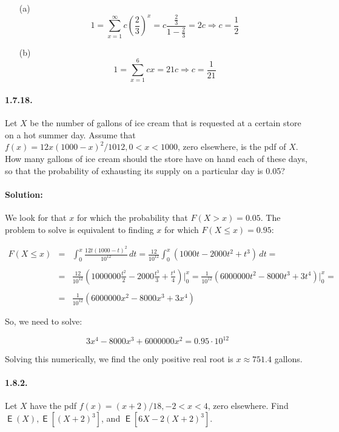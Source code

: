 \documentclass[12pt,a4paper]{article}
\DeclareMathOperator{\E}{\mathsf{E}}
\begin{document}
\begin{itemize}
	\item[(a)]
	\[
		1 = \sum_{x=1}^{\infty} c \left(\frac{2}{3}\right)^{x} = c\frac{\frac{2}{3}}{1 - \frac{2}{3}} = 2c \Rightarrow c = \frac{1}{2}
	\]
	
	\item[(b)]
	\[
		1 = \sum_{x=1}^{6}cx = 21c \Rightarrow c = \frac{1}{21}
	\]
\end{itemize} 

\paragraph{1.7.18.} Let $X$ be the number of gallons of ice cream that is requested at a certain store on a hot summer day. Assume that $f(x) = 12x(1000-x)^{2}/1012, 0 < x < 1000$, zero elsewhere, is the pdf of $X$. How many gallons of ice cream should the store have on hand each of these days, so that the probability of exhausting its supply on a particular day is 0.05?

\paragraph{Solution:} We look for that $x$ for which the probability that $F(X > x) = 0.05$. The problem to solve is equivalent to finding $x$ for which $F(X \leq x) = 0.95$:

\[
\begin{array}{lcl}
	F(X \leq x) & = & \displaystyle \int_{0}^{x} \frac{12t(1000-t)^{2}}{10^{12}}\,dt = \frac{12}{10^{12}} \int_{0}^{x} (1000t - 2000t^{2} + t^{3})\,dt = \\
	\quad\\
	& = & \displaystyle \frac{12}{10^{12}}\left(1000000\frac{t^{2}}{2} - 2000\frac{t^{3}}{3} + \frac{t^{4}}{4}\right)\big|_{0}^{x} = \frac{1}{10^{12}}\left(6000000t^{2} - 8000t^{3} + 3t^{4}\right)\big|_{0}^{x} = \\
	\quad\\
	& = & \displaystyle\frac{1}{10^{12}}\left(6000000x^{2} - 8000x^{3} + 3x^{4}\right)
\end{array}
\]

So, we need to solve:

\[
3x^{4} - 8000x^{3} +  6000000x^{2} = 0.95\cdot 10^{12}
\]

Solving this numerically, we find the only positive real root is $x\approx 751.4$ gallons.

\paragraph{1.8.2.} Let $X$ have the pdf $f(x) = (x + 2)/18, -2 < x < 4$, zero elsewhere. Find $ \E(X), \E[(X + 2)^{3}] $, and $ \E[6X - 2(X + 2)^{3}] $.
\end{document}
